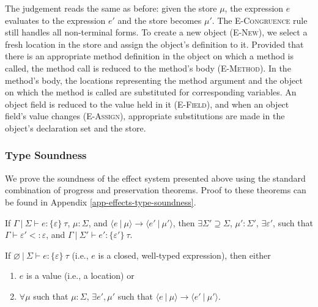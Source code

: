 The judgement reads the same as before: given the store $\mu$, the expression $e$ evaluates to the expression $e'$ and the store becomes $\mu'$. The \textsc{E-Congruence} rule still handles all non-terminal forms. To create a new object (\mbox{\textsc{E-New}}), we select a fresh location in the store and assign the object's definition to it. Provided that there is an appropriate method definition in the object on which a method is called, the method call is reduced to the method's body (\textsc{E-Method}). In the method's body, the locations representing the method argument and the object on which the method is called are substituted for corresponding variables. An object field is reduced to the value held in it (\textsc{E-Field}), and when an object field's value changes (\textsc{E-Assign}), appropriate substitutions are made in the object's declaration set and the store.

\subsubsection{Type Soundness}
We prove the soundness of the effect system presented above using the standard combination of progress and preservation theorems. Proof to these theorems can be found in Appendix \ref{app-effects-type-soundness}.

\begin{theorem}[Preservation]
If \mbox{$\Gamma~|~\Sigma \vdash e : \{ \varepsilon \}~\tau$}, \mbox{$\mu : \Sigma$}, and \mbox{$\langle e~|~\mu \rangle \longrightarrow \langle e'~|~\mu' \rangle$}, then \mbox{$\exists \Sigma' \supseteq \Sigma$}, \mbox{$\mu' : \Sigma'$}, $\exists \varepsilon'$, such that $\Gamma \vdash \varepsilon' <: \varepsilon$, and \mbox{$\Gamma~|~\Sigma' \vdash e' : \{ \varepsilon' \}~\tau$}.
\label{theorem-preservation}
\end{theorem}

 \begin{theorem}[Progress]
 \label{theorem-progress}
If $\varnothing~|~\Sigma \vdash e : \{ \varepsilon \}~\tau$ (i.e., $e$ is a closed, well-typed expression), then either
\begin{enumerate}
\item $e$ is a value (i.e., a location) or
\item $\forall \mu$ such that $\mu : \Sigma$,
   $\exists e', \mu'$ such that $\langle e~|~\mu \rangle \longrightarrow \langle e'~|~\mu' \rangle$.
\end{enumerate}
\end{theorem}






